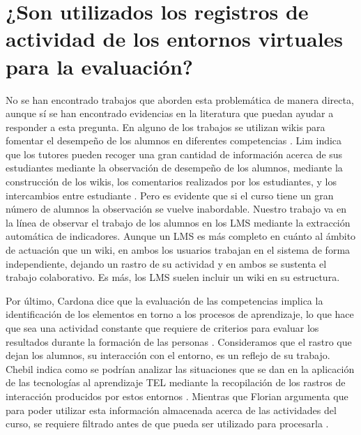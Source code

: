 \section{¿Son utilizados los registros de actividad de los entornos virtuales para la evaluación?}

No se han encontrado trabajos que aborden esta problemática de manera directa, aunque sí se han encontrado evidencias en la literatura que puedan ayudar a responder a esta pregunta. En alguno de los trabajos se utilizan wikis para fomentar el desempeño de los alumnos en diferentes competencias \cite{Piedra:2010}. Lim indica que los tutores pueden recoger una gran cantidad de información acerca de sus estudiantes mediante la observación de desempeño de los alumnos, mediante la construcción de los wikis, los comentarios realizados por los estudiantes, y los intercambios entre estudiante \cite{Lim:2011}. Pero es evidente que si el curso tiene un gran número de alumnos la observación se vuelve inabordable. Nuestro trabajo va en la línea de observar el trabajo de los alumnos en los LMS mediante la extracción automática de indicadores. Aunque un LMS es más completo en cuánto al ámbito de actuación que un wiki, en ambos los usuarios trabajan en el sistema de forma independiente, dejando un rastro de su actividad y en ambos se sustenta el trabajo colaborativo. Es más, los LMS suelen incluir un wiki en su estructura. 

Por último, Cardona dice que la evaluación de las competencias implica la identificación de los elementos en torno a los procesos de aprendizaje, lo que hace que sea una actividad constante que requiere de criterios para evaluar los resultados durante la formación de las personas \cite{Cardona:2013}. Consideramos que el rastro que dejan los alumnos, su interacción con el entorno, es un reflejo de su trabajo. Chebil indica como se podrían analizar las situaciones que se dan en la aplicación de las tecnologías al aprendizaje TEL mediante la recopilación de los rastros de interacción producidos por estos entornos \cite{Chebil:2012}. Mientras que Florian argumenta que para poder utilizar esta información almacenada acerca de las actividades del curso, se requiere filtrado antes de que pueda ser utilizado para procesarla \cite{Florian:2011}.


